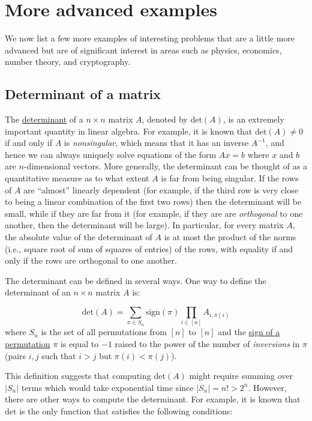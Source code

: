 \section{More advanced examples}\label{More-advanced-examples}

We now list a few more examples of interesting problems that are a
little more advanced but are of significant interest in areas such as
physics, economics, number theory, and cryptography.

\subsection{Determinant of a matrix}\label{Determinant-of-a-matrix}

The \href{https://en.wikipedia.org/wiki/Determinant}{determinant} of a
\(n\times n\) matrix \(A\), denoted by \(\mathrm{det}(A)\), is an
extremely important quantity in linear algebra. For example, it is known
that \(\mathrm{det}(A) \neq 0\) if and only if \(A\) is
\emph{nonsingular}, which means that it has an inverse \(A^{-1}\), and
hence we can always uniquely solve equations of the form \(Ax = b\)
where \(x\) and \(b\) are \(n\)-dimensional vectors. More generally, the
determinant can be thought of as a quantitative measure as to what
extent \(A\) is far from being singular. If the rows of \(A\) are
``almost'' linearly dependent (for example, if the third row is very
close to being a linear combination of the first two rows) then the
determinant will be small, while if they are far from it (for example,
if they are are \emph{orthogonal} to one another, then the determinant
will be large). In particular, for every matrix \(A\), the absolute
value of the determinant of \(A\) is at most the product of the norms
(i.e., square root of sum of squares of entries) of the rows, with
equality if and only if the rows are orthogonal to one another.

The determinant can be defined in several ways. One way to define the
determinant of an \(n\times n\) matrix \(A\) is:

\[
\mathrm{det}(A) = \sum_{\pi \in S_n} \mathrm{sign}(\pi)\prod_{i\in [n]}A_{i,\pi(i)} \label{determinanteq}
\] where \(S_n\) is the set of all permutations from \([n]\) to \([n]\)
and the
\href{https://en.wikipedia.org/wiki/Parity_of_a_permutation}{sign of a
permutation} \(\pi\) is equal to \(-1\) raised to the power of the
number of \emph{inversions} in \(\pi\) (pairs \(i,j\) such that \(i>j\)
but \(\pi(i)<\pi(j)\)).

This definition suggests that computing \(\mathrm{det}(A)\) might
require summing over \(|S_n|\) terms which would take exponential time
since \(|S_n| = n! > 2^n\). However, there are other ways to compute the
determinant. For example, it is known that \(\mathrm{det}\) is the only
function that satisfies the following conditions:

